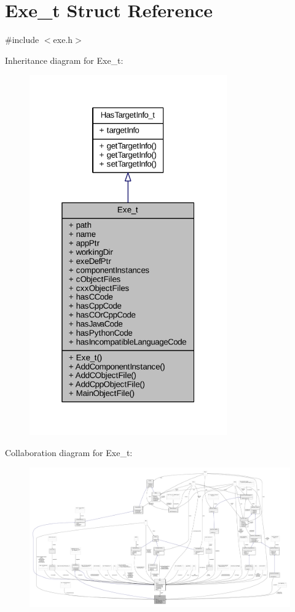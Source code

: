 \hypertarget{struct_exe__t}{}\section{Exe\+\_\+t Struct Reference}
\label{struct_exe__t}


{\ttfamily \#include $<$exe.\+h$>$}



Inheritance diagram for Exe\+\_\+t\+:
\nopagebreak
\begin{figure}[H]
\begin{center}
\leavevmode
\includegraphics[width=241pt]{struct_exe__t__inherit__graph}
\end{center}
\end{figure}


Collaboration diagram for Exe\+\_\+t\+:
\nopagebreak
\begin{figure}[H]
\begin{center}
\leavevmode
\includegraphics[width=350pt]{struct_exe__t__coll__graph}
\end{center}
\end{figure}

